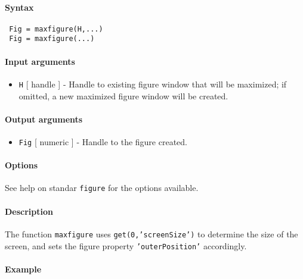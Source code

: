 


	\paragraph{Syntax}
 
 \begin{verbatim}
 Fig = maxfigure(H,...)
 Fig = maxfigure(...)
 \end{verbatim}
 
 \paragraph{Input arguments}
 
 \begin{itemize}
 \item
   \texttt{H} {[} handle {]} - Handle to existing figure window that will
   be maximized; if omitted, a new maximized figure window will be
   created.
 \end{itemize}
 
 \paragraph{Output arguments}
 
 \begin{itemize}
 \item
   \texttt{Fig} {[} numeric {]} - Handle to the figure created.
 \end{itemize}
 
 \paragraph{Options}
 
 See help on standar \texttt{figure} for the options available.
 
 \paragraph{Description}
 
 The function \texttt{maxfigure} uses \texttt{get(0,'screenSize')} to
 determine the size of the screen, and sets the figure property
 \texttt{'outerPosition'} accordingly.
 
 \paragraph{Example}


